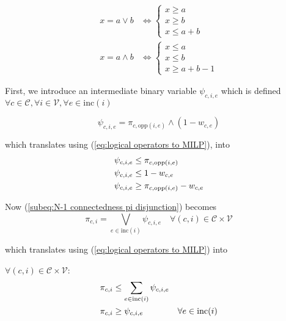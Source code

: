 \begin{subequations}
    \begin{align}
        x = a \vee b   & \Leftrightarrow \begin{cases}x \ge a \\ x \ge b \\ x \le a+b\end{cases}   \\
        x = a \wedge b & \Leftrightarrow \begin{cases}x \le a \\ x \le b \\ x \ge a+b-1\end{cases}
    \end{align}\label{eq:logical operators to MILP}
\end{subequations}

First, we introduce an intermediate binary variable $\psi_{c,i,e}$ which is
defined
$\forall c \in \mathcal{C}, \forall i \in \mathcal{V}, \forall e \in \text{inc}(i
)$

\begin{equation}
    \psi_{c,i,e}= \pi_{c,\text{opp}(i,e)}\wedge (1-w_{c,e})
\end{equation}

which translates using (\ref{eq:logical operators to MILP}), into
\begin{subequations}
    \allowdisplaybreaks
    \begin{align}
        \psi_{c,i,e} & \le \pi_{c,\text{opp}(i,e)}            \\
        \psi_{c,i,e} & \le 1 - w_{c,e}\label{eq:BigM Mix-off} \\
        \psi_{c,i,e} & \ge \pi_{c,\text{opp}(i,e)}- w_{c,e}
    \end{align}
\end{subequations}

Now (\ref{subeq:N-1 connectedness pi disjunction}) becomes
\begin{equation}
    \pi_{c,i}= \bigvee_{e \in \text{inc}(i)}\psi_{c,i,e}\quad \forall (c,i) \in \mathcal{C}
    \times\mathcal{V}
\end{equation}

which translates using (\ref{eq:logical operators to MILP}) into

$\forall (c,i) \in \mathcal{C}\times\mathcal{V}$:
\begin{subequations}
    \allowdisplaybreaks
    \begin{align}
        \pi_{c,i} & \le \sum_{e \in \text{inc}(i) }\psi_{c,i,e} \\
        \pi_{c,i} & \ge \psi_{c,i,e}                           & \forall e \in \text{inc}(i)
    \end{align}
\end{subequations}